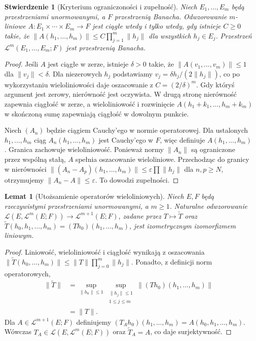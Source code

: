 \documentclass[11pt,a4paper]{article}
\numberwithin{equation}{section}
\theoremstyle{plain}
\newtheorem{stwierdzenie}[twierdzenie]{Stwierdzenie}
\newtheorem{lemat}[twierdzenie]{Lemat}
\theoremstyle{definition}
\theoremstyle{remark}
\begin{document}
\begin{stwierdzenie}[Kryterium ograniczoności i zupełność]
\label{prop:multi-banach15}
Niech $E_1,\ldots,E_m$ będą przestrzeniami unormowanymi, a $F$ przestrzenią Banacha. Odwzorowanie $m$-liniowe $A:E_1\times\cdots\times E_m\to F$ jest ciągłe wtedy i tylko wtedy, gdy istnieje $C\ge0$ takie, że
$\|A(h_1,\ldots,h_m)\|\le C\prod_{j=1}^m\|h_j\|$ dla wszystkich $h_j\in E_j$. Przestrzeń $\mathcal L^m(E_1,\ldots,E_m;F)$ jest przestrzenią Banacha.
\end{stwierdzenie}
\begin{proof}
Jeśli $A$ jest ciągłe w zerze, istnieje $\delta>0$ takie, że $\|A(v_1,\ldots,v_m)\|\le1$ dla $\|v_j\|<\delta$. Dla niezerowych $h_j$ podstawiamy $v_j=\delta h_j/(2\|h_j\|)$, co po wykorzystaniu wieloliniowości daje oszacowanie z $C=(2/\delta)^m$. Gdy któryś argument jest zerowy, nierówność jest oczywista. W drugą stronę nierówność zapewnia ciągłość w zerze, a wieloliniowość i rozwinięcie $A(h_1+k_1,\ldots,h_m+k_m)$ w skończoną sumę zapewniają ciągłość w dowolnym punkcie.

Niech $(A_n)$ będzie ciągiem Cauchy'ego w normie operatorowej. Dla ustalonych $h_1,\ldots,h_m$ ciąg $A_n(h_1,\ldots,h_m)$ jest Cauchy'ego w $F$, więc definiuje $A(h_1,\ldots,h_m)$. Granica zachowuje wieloliniowość. Ponieważ normy $\|A_n\|$ są ograniczone przez wspólną stałą, $A$ spełnia oszacowanie wieloliniowe. Przechodząc do granicy w nierówności $\|(A_n-A_p)(h_1,\ldots,h_m)\|\le\varepsilon\prod\|h_j\|$ dla $n,p\ge N$, otrzymujemy $\|A_n-A\|\le\varepsilon$. To dowodzi zupełności.
\end{proof}

\begin{lemat}[Utożsamienie operatorów wieloliniowych]
\label{lem:currying15}
Niech $E,F$ będą rzeczywistymi przestrzeniami unormowanymi, a $m\ge1$. Naturalne odwzorowanie
$\mathcal L(E,\mathcal L^m(E;F))\to\mathcal L^{m+1}(E;F)$, zadane przez $T\mapsto\widetilde T$ oraz $\widetilde T(h_0,h_1,\ldots,h_m)=(Th_0)(h_1,\ldots,h_m)$, jest izometrycznym izomorfizmem liniowym.
\end{lemat}
\begin{proof}
Liniowość, wieloliniowość i ciągłość wynikają z oszacowania $\|\widetilde T(h_0,\ldots,h_m)\|\le\|T\|\prod_{j=0}^m\|h_j\|$. Ponadto, z definicji norm operatorowych,
\[
\begin{aligned}
\|\widetilde T\|&=\sup_{\|h_0\|\le1}\sup_{\substack{\|h_j\|\le1\\1\le j\le m}}\|(Th_0)(h_1,\ldots,h_m)\|\\
&=\|T\|.
\end{aligned}
\]
Dla $A\in\mathcal L^{m+1}(E;F)$ definiujemy $(T_Ah_0)(h_1,\ldots,h_m)=A(h_0,h_1,\ldots,h_m)$. Wówczas $T_A\in\mathcal L(E,\mathcal L^m(E;F))$ oraz $\widetilde T_A=A$, co daje surjektywność.
\end{proof}
\end{document}

